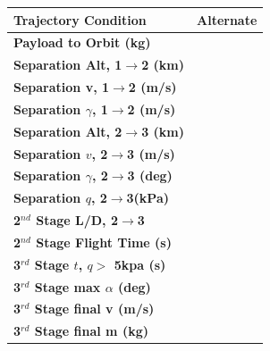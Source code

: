 \begin{table}
	\centering
	\begin{tabular}{l c} 
		\hline \textbf{Trajectory Condition}
		& Alternate
		\\
		\hline \textbf{Payload to Orbit (kg)}
		& \PayloadToOrbitAlternate
		\\
		\textbf{Separation Alt, 1$\rightarrow$2 (km)}
		& \firstsecondSeparationAltAlternate
		\\
		\textbf{Separation v, 1$\rightarrow$2 (m/s)}
		& \firstsecondSeparationvAlternate
		\\
		\textbf{Separation $\gamma$, 1$\rightarrow$2 (m/s)}
		& \firstsecondSeparationgammaAlternate
		\\
		\textbf{Separation Alt, 2$\rightarrow$3 (km)}
		& \secondthirdSeparationAltAlternate
		\\
		\textbf{Separation $v$, 2$\rightarrow$3 (m/s)}
		& \secondthirdSeparationvAlternate
		\\
		\textbf{Separation $\gamma$, 2$\rightarrow$3 (deg)}
		& \secondthirdSeparationgammaAlternate
		\\
		\textbf{Separation $q$, 2$\rightarrow$3(kPa)}
		& \secondthirdSeparationqAlternate
		\\
		\textbf{2$^{nd}$ Stage L/D, 2$\rightarrow$3}
		& \secondthirdSeparationLDAlternate
		\\
		\textbf{2$^{nd}$ Stage Flight Time (s)}
		& \secondFlightTimeAlternate
		\\
		\textbf{3$^{rd}$ Stage $t$, $q >$ 5kpa (s)}
		& \thirdqOverFiveAlternate
		\\
		\textbf{3$^{rd}$ Stage max $\alpha$ (deg)}
		& \thirdmaxAoAAlternate
		\\
		\textbf{3$^{rd}$ Stage final v (m/s)}
		& \thirdcircvAlternate
		\\
		\textbf{3$^{rd}$ Stage final m (kg)}
		& \thirdcircmAlternate
		\\
		\hline 
	\end{tabular} 
\end{table}
